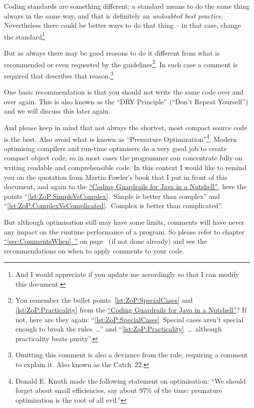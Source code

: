 \documentclass[11pt,a4paper, titlepage, parskip=half, headsepline, footsepline, cleardoublepage=current, headheight=1cm]{scrbook}
\newcommand*{\tqfullvref}[1]{\hyperref[{#1}]{“\ref*{#1}~\nameref*{#1}”} on page~\pageref{#1}}
\newcommand*{\ngref}{\hyperref[lst:NutshellGuardrails]{“Coding Guardrails for Java in a Nutshell”}}
\begin{document}
Coding standards are something different; a standard means to do the same thing always in the same way, and that is definitely an \textit{undoubted best practice}. Nevertheless there could be better ways to do that thing – in that case, change the standard\footnote{And I would appreciate if you update me accordingly so that I can modify this document.}

But as always there may be good reasons to do it different from what is recommended or even requested by the guidelines\footnote{You remember the bullet points~\ref{lst:ZoP:SpecialCases} and \ref{lst:ZoP:Practicality} from the \ngref? If not, here are they again: “\ref{lst:ZoP:SpecialCases}~Special cases aren't special enough to break the rules~…” and “\ref{lst:ZoP:Practicality}~…~although practicality beats purity”.}. In such case a comment is required that describes that reason.\footnote{Omitting this comment is also a deviance from the rule, requiring a comment to explain it. Also known as the Catch~22\autocite{WIKIPEDIA:Catch22}.}

One basic recommendation is that you should not write the same code over and over again. This is also known as the “DRY Principle” (“Don't Repeat Yourself”) and we will discuss this later again.

And please keep in mind that not always the shortest, most compact source code is the best. Also avoid what is known as “Premature Optimization”\footnote{Donald E. Knuth made the following statement on optimisation: “We should forget about small efficiencies, say about 97\% of the time: premature optimization is the root of all evil.”\autocite{Knuth:PrematureOptimization}}. Modern optimising compilers and run-time optimisers do a very good job to create compact object code, so in most cases the programmer can concentrate fully on writing readable and comprehensible code. In this context I would like to remind you on the quotation from Martin Fowler's book that I put in front of this document, and again to the \ngref, here the points “\ref{lst:ZoP:SimpleVsComplex}.~Simple is better than complex” and “\ref{lst:ZoP:ComplexVsComplicated}.~Complex is better than complicated”.

But although optimisation still may have some limits, comments will have never any impact on the runtime performance of a program. So please refer to chapter \tqfullvref{sec:CommentsWhen} (if not done already) and see the recommendations on when to apply comments to your code.

\end{document}
